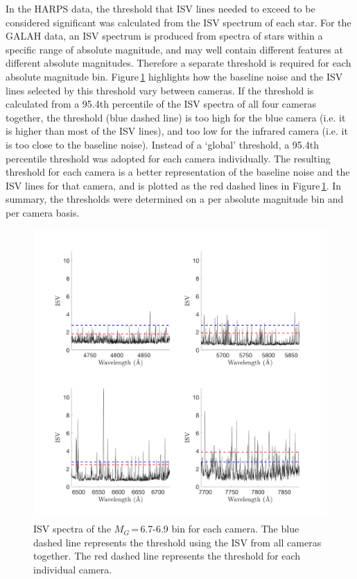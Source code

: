 In the HARPS data, the threshold that ISV lines needed to exceed to be considered significant was calculated from the ISV spectrum of each star. For the GALAH data, an ISV spectrum is produced from spectra of stars within a specific range of absolute magnitude, and may well contain different features at different absolute magnitudes. Therefore a separate threshold is required for each absolute magnitude bin. Figure\,\ref{figGALAH_threshold_global} highlights how the baseline noise and the ISV lines selected by this threshold vary between cameras. If the threshold is calculated from a 95.4th percentile of the ISV spectra of all four cameras together, the threshold (blue dashed line) is too high for the blue camera (i.e. it is higher than most of the ISV lines), and too low for the infrared camera (i.e. it is too close to the baseline noise). Instead of a `global' threshold, a 95.4th percentile threshold was adopted for each camera individually. The resulting threshold for each camera is a better representation of the baseline noise and the ISV lines for that camera, and is plotted as the red dashed lines in Figure\,\ref{figGALAH_threshold_global}. In summary, the thresholds were determined on a per absolute magnitude bin and per camera basis.\\

\begin{figure}
    \hspace{-2cm}
    \includegraphics[width=1.2\textwidth]{GALAHthresholdglobal.png}
    \caption{ISV spectra of the $M_G$\,=\,6.7-6.9 bin for each camera. The blue dashed line represents the threshold using the ISV from all cameras together. The red dashed line represents the threshold for each individual camera.}
    \label{figGALAH_threshold_global}
\end{figure}


